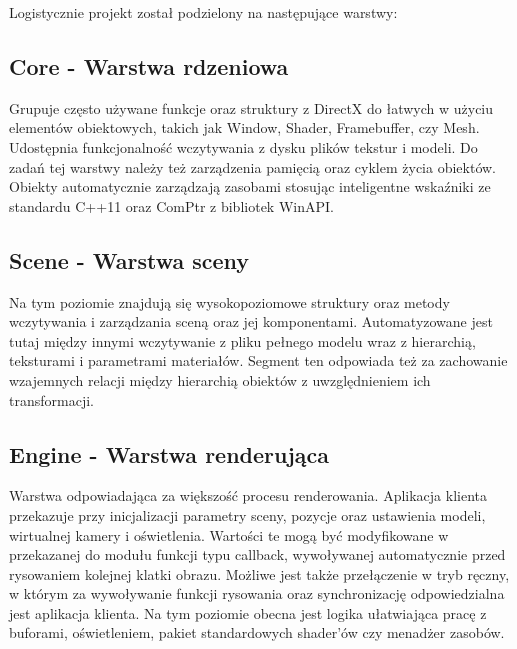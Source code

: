 Logistycznie projekt został podzielony na następujące warstwy:

\subsection{\textbf{Core} - Warstwa rdzeniowa}
Grupuje często używane funkcje oraz struktury z DirectX do łatwych w użyciu elementów obiektowych, takich jak Window, Shader, Framebuffer, czy Mesh.
Udostępnia funkcjonalność wczytywania z dysku plików tekstur i modeli.
Do zadań tej warstwy należy też zarządzenia pamięcią oraz cyklem życia obiektów.
Obiekty automatycznie zarządzają zasobami stosując inteligentne wskaźniki ze standardu C++11 oraz ComPtr z bibliotek WinAPI.

\subsection{\textbf{Scene} - Warstwa sceny}
Na tym poziomie znajdują się wysokopoziomowe struktury oraz metody wczytywania i zarządzania sceną oraz jej komponentami.
Automatyzowane jest tutaj między innymi wczytywanie z pliku pełnego modelu wraz z hierarchią, teksturami i parametrami materiałów.
Segment ten odpowiada też za zachowanie wzajemnych relacji między hierarchią obiektów z uwzględnieniem ich transformacji.

\subsection{\textbf{Engine} - Warstwa renderująca}
Warstwa odpowiadająca za większość procesu renderowania.
Aplikacja klienta przekazuje przy inicjalizacji parametry sceny, pozycje oraz ustawienia modeli, wirtualnej kamery i oświetlenia.
Wartości te mogą być modyfikowane w przekazanej do modułu funkcji typu callback, wywoływanej automatycznie przed rysowaniem kolejnej klatki obrazu.
Możliwe jest także przełączenie w tryb ręczny, w którym za wywoływanie funkcji rysowania oraz synchronizację odpowiedzialna jest aplikacja klienta.
Na tym poziomie obecna jest logika ułatwiająca pracę z buforami, oświetleniem, pakiet standardowych shader'ów czy menadżer zasobów.